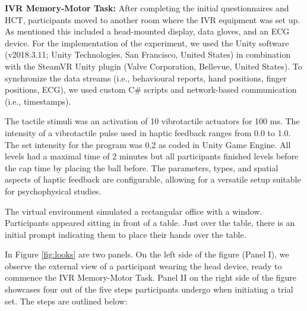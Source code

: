 \documentclass[12pt,oneside,openright]{report}
\begin{document}
\textbf{IVR Memory-Motor Task:} 
After completing the initial questionnaires and HCT, participants moved to another room where the IVR equipment was set up. As mentioned this included a head-mounted display, data gloves, and an ECG device. 
For the implementation of the experiment, we used the Unity software (v2018.3.11; Unity Technologies, San Francisco, United States)  in combination with the SteamVR Unity plugin (Valve Corporation, Bellevue, United States). To synchronize the data streams (i.e., behavioural reports, hand positions, finger positions, ECG), we used custom C\# scripts and network-based communication (i.e., timestamps). 

The tactile stimuli was an activation of 10 vibrotactile actuators for 100 ms. The intensity of a vibrotactile pulse used in haptic feedback ranges from 0.0 to 1.0. The set intensity for the program was 0,2 as coded in Unity Game Engine. All levels had a maximal time of 2 minutes but all participants finished levels before the cap time by placing the ball before. The parameters, types, and spatial aspects of haptic feedback are configurable, allowing for a versatile setup suitable for psychophysical studies.

The virtual environment simulated a rectangular office with a window. Participants appeared sitting in front of a table. Just over the table, there is an initial prompt indicating them to place their hands over the table. 

In Figure \ref{fig:looks} are two panels. On the left side of the figure (Panel I), we observe the external view of a participant wearing the head device, ready to commence the IVR Memory-Motor Task. Panel II on the right side of the figure showcases four out of the five steps participants undergo when initiating a trial set. The steps are outlined below:
\end{document}
